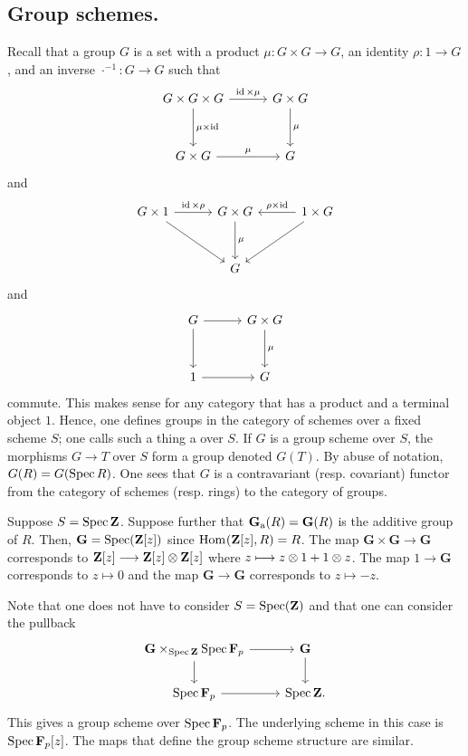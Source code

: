 \documentclass [11 pt, oneside] {article}
\begin{document}
\subsection{Group schemes.}
Recall that a group $G$ is a set with a product $\mu:G\times G\longrightarrow G$, an identity $\rho:1\longrightarrow G$, and an inverse $\cdot ^{-1} : G\longrightarrow G$ such that
\[
\begin{tikzcd}[column sep = 3 em, row sep = 3 em]
	G\times G \times G \ar[r, "\id\times \mu"] \ar[d, "\mu\times \id"] & G\times G\ar[d,"\mu"]\\
	G\times G \ar[r,"\mu"] & G
\end{tikzcd}
\]
and
\[
\begin{tikzcd}[column sep = 3 em, row sep = 3 em]
	G\times 1 \ar[r, "\id\times \rho"]\ar[dr] &G\times G\ar[d, "\mu"]& 1\times G \ar[l, "\rho\times \id", swap] \ar[dl]\\
						  & G
\end{tikzcd}
\]
and
\[
\begin{tikzcd}[column sep = 3 em, row sep = 3 em]
	G\ar[r] \ar[d] & G\times G\ar[d,"\mu"]\\
	1\ar[r] & G
\end{tikzcd}
\]
commute. This makes sense for any category that has a product and a terminal object $1$. 
Hence, one defines groups in the category of schemes over a fixed scheme $S$; one calls such a thing a  over $S$. If $G$ is a group scheme over $S$, the morphisms $G\longrightarrow T$ over $S$ form a group denoted $G(T)$. By abuse of notation, $G(R) = G(\operatorname{Spec} R)$.
One sees that $G$ is a contravariant (resp. covariant) functor from the category of schemes (resp. rings) to the category of groups.

\begin{example}[ ]\label{ga}\text{}
Suppose $S=\operatorname{Spec} \mathbf{Z}$. Suppose further that $\mathbf{G}\textsubscript{a}(R)=\mathbf{G}(R)$ is the additive group of $R$. 
Then, $\mathbf{G}=\operatorname{Spec} (\mathbf{Z}[z])$ since $\operatorname{Hom}_{}(\mathbf{Z}[z], R)=R$. The map $\mathbf{G}\times \mathbf{G}\longrightarrow \mathbf{G}$ corresponds to $\mathbf{Z}[z] \longrightarrow \mathbf{Z}[z]\otimes \mathbf{Z}[z]$ where $z\longmapsto z\otimes 1 + 1\otimes z$. The map $1\longrightarrow \mathbf{G}$ corresponds to $z\longmapsto 0$ and the map $\mathbf{G}\longrightarrow \mathbf{G}$ corresponds to $z\longmapsto -z$.

Note that one does not have to consider $S=\operatorname{Spec} (\mathbf{Z})$ and that one can consider the pullback
\[
\begin{tikzcd}
	\mathbf{G}\times_{\Spec \mathbf{Z}} \Spec \mathbf{F}_{p} \ar[r]\ar[d] & \mathbf{G}\ar[d]\\
	\Spec \mathbf{F}_{p} \ar[r] & \Spec \mathbf{Z}.
\end{tikzcd}
\]
This gives a group scheme over $\operatorname{Spec} \mathbf{F}_{p}$. The underlying scheme in this case is $\operatorname{Spec} \mathbf{F}_{p}[z]$. The maps that define the group scheme structure are similar.
\end{example}
\end{document}
